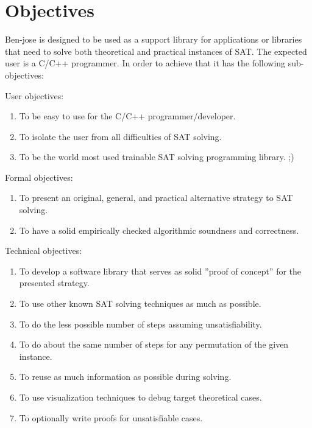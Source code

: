 \documentclass{easychair}
\begin{document}
\section{Objectives}
\label{sect:objectives}

Ben-jose is designed to be used as a support library for applications or libraries that need to solve both theoretical and practical instances of SAT. The expected user is a C/C++ programmer. In order to achieve that it has the following sub-objectives:

User objectives:
\begin{enumerate}
\item
To be easy to use for the C/C++ programmer/developer.
\item
To isolate the user from all difficulties of SAT solving.
\item
To be the world most used trainable SAT solving programming library. ;)
\end{enumerate}

Formal objectives:
\begin{enumerate}
\item
To present an original, general, and practical alternative strategy to SAT solving.
\item
To have a solid empirically checked algorithmic soundness and correctness.
\end{enumerate}

Technical objectives:
\begin{enumerate}
\item
To develop a software library that serves as solid ''proof of concept'' for the presented strategy.
\item
To use other known SAT solving techniques as much as possible.
\item
To do the less possible number of steps assuming unsatisfiability.
\item
To do about the same number of steps for any permutation of the given instance.
\item
To reuse as much information as possible during solving.
\item
To use visualization techniques to debug target theoretical cases.
\item
To optionally write proofs for unsatisfiable cases.
\end{enumerate}

\end{document}
